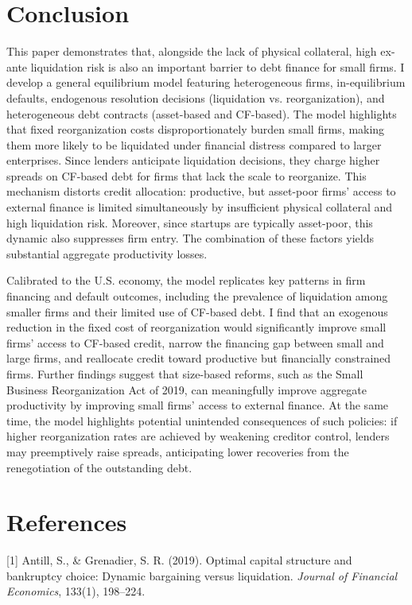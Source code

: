\documentclass[12pt]{article}
\begin{document}
\section{Conclusion}

This paper demonstrates that, alongside the lack of physical collateral, high ex-ante liquidation risk is also an important barrier to debt finance for small firms. I develop a general equilibrium model featuring heterogeneous firms, in-equilibrium defaults, endogenous resolution decisions (liquidation vs. reorganization), and heterogeneous debt contracts (asset-based and CF-based). The model highlights that fixed reorganization costs disproportionately burden small firms, making them more likely to be liquidated under financial distress compared to larger enterprises. Since lenders anticipate liquidation decisions, they charge higher spreads on CF-based debt for firms that lack the scale to reorganize. This mechanism distorts credit allocation: productive, but asset-poor firms' access to external finance is limited simultaneously by insufficient physical collateral and high liquidation risk. Moreover, since startups are typically asset-poor, this dynamic also suppresses firm entry. The combination of these factors yields substantial aggregate productivity losses.

Calibrated to the U.S. economy, the model replicates key patterns in firm financing and default outcomes, including the prevalence of liquidation among smaller firms and their limited use of CF-based debt. I find that an exogenous reduction in the fixed cost of reorganization would significantly improve small firms' access to CF-based credit, narrow the financing gap between small and large firms, and reallocate credit toward productive but financially constrained firms. Further findings suggest that size-based reforms, such as the Small Business Reorganization Act of 2019, can meaningfully improve aggregate productivity by improving small firms' access to external finance. At the same time, the model highlights potential unintended consequences of such policies: if higher reorganization rates are achieved by weakening creditor control, lenders may preemptively raise spreads, anticipating lower recoveries from the renegotiation of the outstanding debt.

\newpage
\section*{References}

\hangindent=0.7cm
[1] Antill, S., \& Grenadier, S. R. (2019). Optimal capital structure and bankruptcy choice: Dynamic bargaining versus liquidation. \textit{Journal of Financial Economics}, 133(1), 198--224.
\vspace{3mm}
\end{document}
